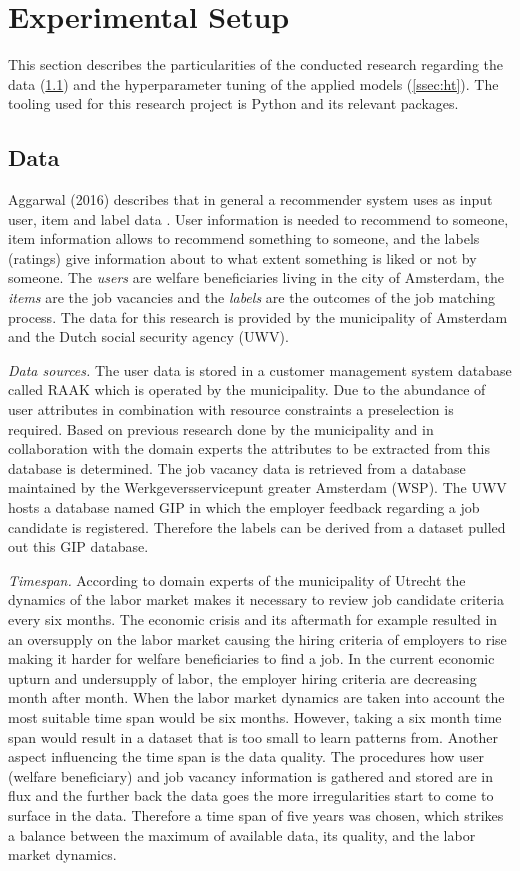 \section{Experimental Setup}
\label{sec:setup}
This section describes the particularities of the conducted research regarding the data (\ref{ssec:data}) and the hyperparameter tuning of the applied models (\ref{ssec:ht}). 
The tooling used for this research project is Python and its relevant packages.

\subsection{Data}
\label{ssec:data}
Aggarwal (2016) describes that in general a recommender system uses as input user, item and label data \cite{aggarwal2016recommender}.
User information is needed to recommend to someone, item information allows to recommend something to someone, and the labels (ratings) give information about to what extent  something is liked or not by someone.
The \textit{users} are welfare beneficiaries living in the city of Amsterdam, the \textit{items} are the job vacancies and the \textit{labels} are the outcomes of the job matching process.
The data for this research is provided by the municipality of Amsterdam and the Dutch social security agency (UWV).

\textit{Data sources.}
The user data is stored in a customer management system database called RAAK which is operated by the municipality.
Due to the abundance of user attributes in combination with resource constraints a preselection is required. 
Based on previous research done by the municipality and in collaboration with the domain experts the attributes to be extracted from this database is determined. 
The job vacancy data is retrieved from a database maintained by the Werkgeversservicepunt greater Amsterdam (WSP).
The UWV hosts a database named GIP in which the employer feedback regarding a job candidate is registered.
Therefore the labels can be derived from a dataset pulled out this GIP database.

\textit{Timespan.}
According to domain experts of the municipality of Utrecht the dynamics of the labor market makes it necessary to review job candidate criteria every six months.
The economic crisis and its aftermath for example resulted in an oversupply on the labor market causing the hiring criteria of employers to rise making it harder for welfare beneficiaries to find a job.
In the current economic upturn and undersupply of labor, the employer hiring criteria are decreasing month after month. 
When the labor market dynamics are taken into account the most suitable time span would be six months.
However, taking a six month time span would result in a dataset that is too small to learn patterns from.
Another aspect influencing the time span is the data quality. 
The procedures how user (welfare beneficiary) and job vacancy information is gathered and stored are in flux and the further back the data goes the more irregularities start to come to surface in the data. 
Therefore a time span of five years was chosen, which strikes a balance between the maximum of available data, its quality, and the labor market dynamics.

